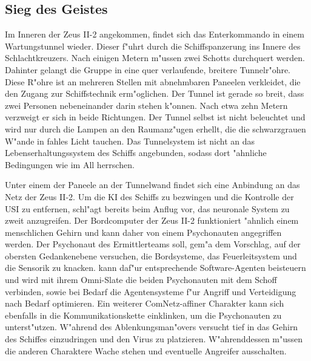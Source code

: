 \subsection{Sieg des Geistes}
Im Inneren der Zeus II-2 angekommen, findet sich das Enterkommando in einem Wartungstunnel wieder. Dieser f"uhrt durch die Schiffspanzerung ins Innere des Schlachtkreuzers. Nach einigen Metern m"ussen zwei Schotts durchquert werden. Dahinter gelangt die Gruppe in eine quer verlaufende, breitere Tunnelr"ohre. Diese R"ohre ist an mehreren Stellen mit abnehmbaren Paneelen verkleidet, die den Zugang zur Schiffstechnik erm"oglichen. Der Tunnel ist gerade so breit, dass zwei Personen nebeneinander darin stehen k"onnen. Nach etwa zehn Metern verzweigt er sich in beide Richtungen. Der Tunnel selbst ist nicht beleuchtet und wird nur durch die Lampen an den Raumanz"ugen erhellt, die die schwarzgrauen W"ande in fahles Licht tauchen. Das Tunnelsystem ist nicht an das Lebenserhaltungssystem des Schiffs angebunden, sodass dort "ahnliche Bedingungen wie im All herrschen.

Unter einem der Paneele an der Tunnelwand findet sich eine Anbindung an das Netz der Zeus II-2. Um die KI des Schiffs zu bezwingen und die Kontrolle der USI zu entfernen, schl"agt \xl{} bereits beim Anflug vor, das neuronale System zu zweit anzugreifen. Der Bordcomputer der Zeus II-2 funktioniert "ahnlich einem menschlichen Gehirn und kann daher von einem Psychonauten angegriffen werden. Der Psychonaut des Ermittlerteams soll, gem"a\3 dem Vorschlag, auf der obersten Gedankenebene versuchen, die Bordsysteme, das Feuerleitsystem und die Sensorik zu knacken. \ml{} kann daf"ur entsprechende Software-Agenten beisteuern und wird mit ihrem Omni-Slate die beiden Psychonauten mit dem Schoff verbinden, sowie bei Bedarf die Agentensysteme f"ur Angriff und Verteidigung nach Bedarf optimieren. Ein weiterer ComNetz-affiner Charakter kann sich ebenfalls in die Kommunikationskette einklinken, um die Psychonauten zu unterst"utzen. W"ahrend des Ablenkungsman"overs versucht \xl{} tief in das Gehirn des Schiffes einzudringen und den Virus zu platzieren. W"ahrenddessen m"ussen die anderen Charaktere Wache stehen und eventuelle Angreifer ausschalten.

